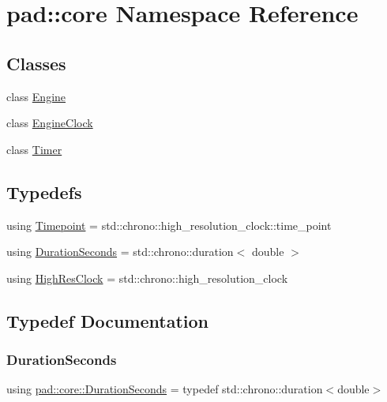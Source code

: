 \hypertarget{namespacepad_1_1core}{}\section{pad\+:\+:core Namespace Reference}
\label{namespacepad_1_1core}
\subsection*{Classes}
\begin{DoxyCompactItemize}
\item 
class \mbox{\hyperlink{classpad_1_1core_1_1_engine}{Engine}}
\item 
class \mbox{\hyperlink{classpad_1_1core_1_1_engine_clock}{Engine\+Clock}}
\item 
class \mbox{\hyperlink{classpad_1_1core_1_1_timer}{Timer}}
\end{DoxyCompactItemize}
\subsection*{Typedefs}
\begin{DoxyCompactItemize}
\item 
using \mbox{\hyperlink{namespacepad_1_1core_a4359864da05f393ed6e69d9d018946ad}{Timepoint}} = std\+::chrono\+::high\+\_\+resolution\+\_\+clock\+::time\+\_\+point
\item 
using \mbox{\hyperlink{namespacepad_1_1core_ade36b718f71561d84c0bf59b5fd151ef}{Duration\+Seconds}} = std\+::chrono\+::duration$<$ double $>$
\item 
using \mbox{\hyperlink{namespacepad_1_1core_a4b3e3b386aa503ef3565538e435d3cf7}{High\+Res\+Clock}} = std\+::chrono\+::high\+\_\+resolution\+\_\+clock
\end{DoxyCompactItemize}


\subsection{Typedef Documentation}
\mbox{\label{namespacepad_1_1core_ade36b718f71561d84c0bf59b5fd151ef}} 
\subsubsection{\texorpdfstring{Duration\+Seconds}{DurationSeconds}}
{\footnotesize\ttfamily using \mbox{\hyperlink{namespacepad_1_1core_ade36b718f71561d84c0bf59b5fd151ef}{pad\+::core\+::\+Duration\+Seconds}} = typedef std\+::chrono\+::duration$<$double$>$}

